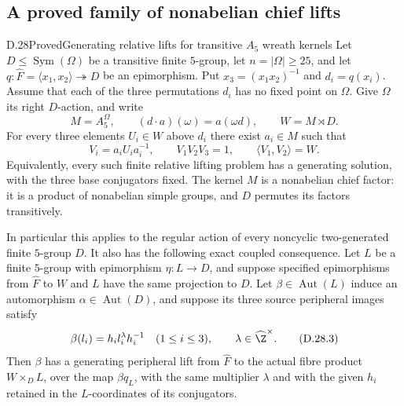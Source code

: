 \subsection{A proved family of nonabelian chief lifts}

\begin{statement}{D.28}{Proved}{Generating relative lifts for transitive $A_5$ wreath kernels}
Let $D\leq\operatorname{Sym}(\Omega)$ be a transitive finite
$5$-group, let $n=|\Omega|\geq25$, and let
$q:\widehat F=\langle x_1,x_2\rangle\twoheadrightarrow D$
be an epimorphism.  Put $x_3=(x_1x_2)^{-1}$ and $d_i=q(x_i)$.
Assume that each of the three permutations $d_i$ has no fixed
point on $\Omega$.  Give $\Omega$ its right $D$-action, and
write
\[
 M=A_5^{\Omega},\qquad
 (d\cdot a)(\omega)=a(\omega d),\qquad W=M\rtimes D.
 \tag{D.28.1}
\]
For every three elements $U_i\in W$ above $d_i$ there exist
$a_i\in M$ such that
\[
 V_i=a_iU_ia_i^{-1},\qquad
 V_1V_2V_3=1,\qquad\langle V_1,V_2\rangle=W.
 \tag{D.28.2}
\]
Equivalently, every such finite relative lifting problem has
a generating solution, with the three base conjugators fixed.
The kernel $M$ is a nonabelian chief factor: it is a product
of nonabelian simple groups, and $D$ permutes its factors
transitively.

In particular this applies to the regular action of every
noncyclic two-generated finite $5$-group $D$.  It also has
the following exact coupled consequence.  Let $L$ be a finite
$5$-group with epimorphism $\eta:L\to D$, and suppose
specified epimorphisms from $\widehat F$ to $W$ and $L$
have the same projection to $D$.  Let
$\beta\in\operatorname{Aut}(L)$ induce an automorphism
$\alpha\in\operatorname{Aut}(D)$, and suppose its three
source peripheral images satisfy
\[
       \beta(l_i)=h_i l_i^\lambda h_i^{-1}
       \quad(1\leq i\leq3),\qquad
       \lambda\in\widehat\Z^\times.
 \tag{D.28.3}
\]
Then $\beta$ has a generating peripheral lift from
$\widehat F$ to the actual fibre product $W\times_D L$,
over the map $\beta q_L$, with the same multiplier
$\lambda$ and with the given $h_i$ retained in the
$L$-coordinates of its conjugators.
\end{statement}

